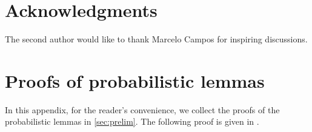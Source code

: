 \documentclass[reqno]{amsart}
\theoremstyle{remark}
\theoremstyle{definition}
\numberwithin{theorem}{section}
\renewcommand{\(}{\bigl(}
\renewcommand{\)}{\bigr)\vphantom{)}}
\begin{document}
\section{Acknowledgments}

The second author would like to thank Marcelo Campos for inspiring discussions.




\printbibliography

\appendix


\section{Proofs of probabilistic lemmas}\label{app:probability-proofs}

In this appendix, for the reader's convenience, we collect the proofs of the probabilistic lemmas in \cref{sec:prelim}. The following proof is given in \cite{yehuda2021slicing}.
\end{document}

